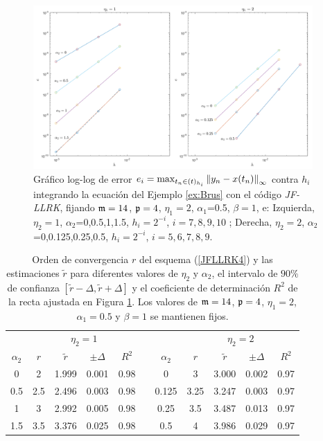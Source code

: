 \begin{figure}[htb]
	\centering
	\includegraphics[width=0.95\textwidth]{Graphics/lldp-fj/out_new.png}
	\caption{Gráfico log-log de error $e_i=\max_{t_n\in(t)_{h_i}}\left\lVert y_n-x(t_n) \right\rVert_\infty$ contra $h_i$ integrando la ecuación del Ejemplo \ref{ex:Brus} con el código \textit{JF-LLRK}, fijando $\mathfrak{m}=14$, $\mathfrak{p}=4$, $\eta_1=2$, $\alpha_1$=0.5, $\beta=1$, e: Izquierda, $\eta_2=1$, $\alpha_2$=0,0.5,1,1.5, $h_i=2^{-i}$, $i=7,8,9,10$ ; Derecha, $\eta_2=2$, $\alpha_2$=0,0.125,0.25,0.5, $h_i=2^{-i}$, $i=5,6,7,8,9$.}
	\label{Fig2}
\end{figure}

\begin{table}[htb]
	\centering
	\caption{
		Orden de convergencia $r$ del esquema (\ref{JFLLRK4}) y las estimaciones $\widetilde{r}$ para diferentes valores de $\eta_2$ y $\alpha_2$, el intervalo de $90\%$ de confianza $[\widetilde{r}-\varDelta,\widetilde{r}+\varDelta]$ y el coeficiente de determinación $R^2$ de la recta ajustada en Figura \ref{Fig2}. Los valores de $\mathfrak{m}=14$, $\mathfrak{p}=4$, $\eta_1=2$, $\alpha_1=0.5$ y $\beta=1$ se mantienen fijos. }
	\begin{adjustbox}{width=0.8\columnwidth,center}
		\begin{tabular}{ c  c c c c  c  c c c c c}
			\hline
			& \multicolumn{4}{c}{$\eta_2=1$} & & & \multicolumn{4}{c}{$\eta_2=2$} \\
			\cline{2-5} \cline{8-11}
			$\alpha_2$ & $r$ & $\widetilde{r}$ & $\pm\varDelta$ & $R^2$ & & $\alpha_2$ & $r$ & $\widetilde{r}$ & $\pm\varDelta$ & $R^2$ \\
			\hline
			0 & 2 & 1.999 & 0.001 & 0.98 & & 0 & 3 & 3.000 & 0.002 & 0.97 \\
			0.5 & 2.5 & 2.496 & 0.003 & 0.98 & & 0.125 & 3.25 & 3.247 & 0.003 & 0.97 \\
			1 & 3 & 2.992 & 0.005 & 0.98 & & 0.25 & 3.5 & 3.487 & 0.013 & 0.97 \\
			1.5 & 3.5 & 3.376 & 0.025 & 0.98 & & 0.5 & 4 & 3.986 & 0.029 & 0.97 \\
			\hline
		\end{tabular}
	\end{adjustbox}
	\label{tab:out}
\end{table}


